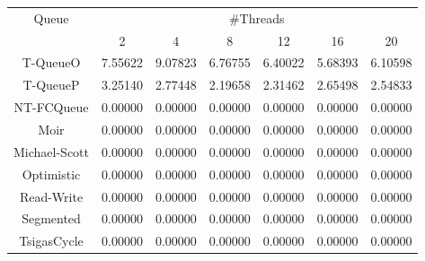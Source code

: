 \begin{tabular}{|c|c|c|c|c|c|c|}
\hline
\multirow{2}{*}{Queue} & \multicolumn{6}{c|}{\#Threads}\\\cline{2-7}& 2 & 4 & 8 & 12 & 16 & 20\\
\hline
\hline
T-QueueO & 7.55622 & 9.07823 & 6.76755 & 6.40022 & 5.68393 & 6.10598\\
T-QueueP & 3.25140 & 2.77448 & 2.19658 & 2.31462 & 2.65498 & 2.54833\\
NT-FCQueue & 0.00000 & 0.00000 & 0.00000 & 0.00000 & 0.00000 & 0.00000\\
Moir & 0.00000 & 0.00000 & 0.00000 & 0.00000 & 0.00000 & 0.00000\\
Michael-Scott & 0.00000 & 0.00000 & 0.00000 & 0.00000 & 0.00000 & 0.00000\\
Optimistic & 0.00000 & 0.00000 & 0.00000 & 0.00000 & 0.00000 & 0.00000\\
Read-Write & 0.00000 & 0.00000 & 0.00000 & 0.00000 & 0.00000 & 0.00000\\
Segmented & 0.00000 & 0.00000 & 0.00000 & 0.00000 & 0.00000 & 0.00000\\
TsigasCycle & 0.00000 & 0.00000 & 0.00000 & 0.00000 & 0.00000 & 0.00000\\
\hline\end{tabular}
